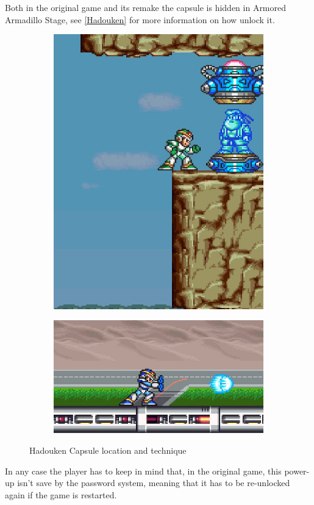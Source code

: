\begin{itemize}
	Both in the original game and its remake the capsule is hidden in Armored Armadillo Stage, see \ref{Hadouken} for more information on how unlock it.
	\begin{figure}[htp]
		\centering
		\begin{subfigure}{0.3\linewidth}
			\centering
			\includegraphics[width=\textwidth]{figures/X1/Armored_armadillo/Armadillo_hadouken.jpg}
		\end{subfigure}
		\begin{subfigure}{0.5\linewidth}
			\centering
			\includegraphics[width=\textwidth]{figures/X1/weapons/Hadouken.jpg}
		\end{subfigure}
		\caption{Hadouken Capsule location and technique}
	\end{figure}
\end{itemize}
	In any case the player has to keep in mind that, in the original game, this power-up isn't save by the password system, meaning that it has to be re-unlocked again if the game is restarted.

